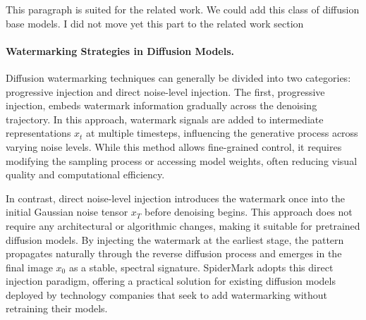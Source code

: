 {\color{blue} This paragraph is suited for the related work. We could add this class of diffusion base models. I did not move yet this part to the related work section}

\paragraph{Watermarking Strategies in Diffusion Models.}
Diffusion watermarking techniques can generally be divided into two categories: progressive injection and direct noise-level injection. 
The first, progressive injection, embeds watermark information gradually across the denoising trajectory. 
In this approach, watermark signals are added to intermediate representations \(x_t\) at multiple timesteps, influencing the generative process across varying noise levels. 
While this method allows fine-grained control, it requires modifying the sampling process or accessing model weights, often reducing visual quality and computational efficiency.

In contrast, direct noise-level injection introduces the watermark once into the initial Gaussian noise tensor \(x_T\) before denoising begins. 
This approach does not require any architectural or algorithmic changes, making it suitable for pretrained diffusion models. 
By injecting the watermark at the earliest stage, the pattern propagates naturally through the reverse diffusion process and emerges in the final image \(x_0\) as a stable, spectral signature. 
SpiderMark adopts this direct injection paradigm, offering a practical solution for existing diffusion models deployed by technology companies that seek to add watermarking without retraining their models.
